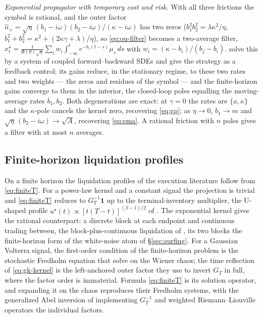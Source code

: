 \documentclass[11pt]{article}
\theoremstyle{plain}
\theoremstyle{definition}
\theoremstyle{remark}
\begin{document}
\emph{Exponential propagator with temporary cost and risk.} With all three frictions the symbol is rational, and the outer factor $\hat n_+=\sqrt\eta\,(b_1-i\omega)(b_2-i\omega)/(\kappa-i\omega)$ has two zeros ($b_1^2b_2^2=\lambda\kappa^2/\eta$, $b_1^2+b_2^2=\kappa^2+(2\kappa\gamma+\lambda)/\eta$), so \eqref{eq:ou-filter} becomes a two-average filter, $x^\star_t=\frac{1}{\Phi(\theta)\sqrt\eta}\sum_i w_i\!\int_{-\infty}^t e^{-b_i(t-s)}\mu_s\,ds$ with $w_i=(\kappa-b_i)/(b_j-b_i)$. \citet{NeumanVoss2022} solve this by a system of coupled forward--backward SDEs and give the strategy as a feedback control; its gains reduce, in the stationary regime, to these two rates and two weights --- the zeros and residues of the symbol --- and the finite-horizon gains converge to them in the interior, the closed-loop poles equalling the moving-average rates $b_1,b_2$. Both degenerations are exact: at $\gamma=0$ the rates are $\{a,\kappa\}$ and the $\kappa$-pole cancels the kernel zero, recovering \eqref{eq:gp}; as $\eta\to0$, $b_1\to m$ and $\sqrt\eta\,(b_2-i\omega)\to\sqrt A$, recovering \eqref{eq:ema}. A rational friction with $n$ poles gives a filter with at most $n$ averages.

\subsection{Finite-horizon liquidation profiles}\label{sec:powerlawFH}

On a finite horizon the liquidation profiles of the execution literature follow from \eqref{eq:finiteT}. For a power-law kernel and a constant signal the projection is trivial and \eqref{eq:finiteT} reduces to $G_T^{-1}\mathbf 1$ up to the terminal-inventory multiplier, the U-shaped profile $u^\star(t)\propto[t(T-t)]^{(\beta-1)/2}$ of \citet[Ex.~2.30]{GatheralSchiedSlynko2012}. The exponential kernel gives the rational counterpart: a discrete block at each endpoint and continuous trading between, the block-plus-continuous liquidation of \citet{ObizhaevaWang2013}, its two blocks the finite-horizon form of the white-noise atom of \S\ref{sec:surfing}. For a Gaussian Volterra signal, the first-order condition of the finite-horizon problem is the stochastic Fredholm equation that \citet{FordeSanchezSmith2022} solve on the Wiener chaos; the time reflection of \eqref{eq:gk-kernel} is the left-anchored outer factor they use to invert $G_T$ in full, where the factor order is immaterial. Formula \eqref{eq:finiteT} is its solution operator, and expanding it on the chaos reproduces their Fredholm systems, with the generalized Abel inversion of \citet{ChakrabartiGeorge1994} implementing $G_T^{-1}$ and weighted Riemann--Liouville operators the individual factors.
\end{document}
